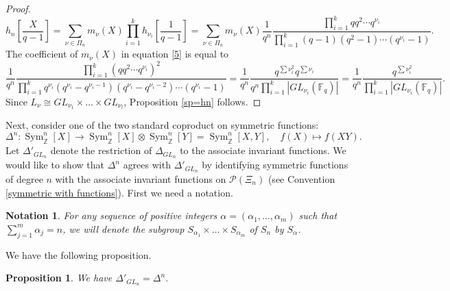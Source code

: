\documentclass{amsart}
\theoremstyle{plain}
\newtheorem{proposition}{Proposition}[section]
\newtheorem{notation}{Notation}[section]
\theoremstyle{definition}
\theoremstyle{remark}
\DeclareMathOperator{\Sym}{Sym}
\begin{document}
\begin{proof}
\begin{equation}
h_{n}\left[\frac{X}{q-1}\right]
=
\sum_{\nu\in\Pi_{n}}m_{\nu}(X)\prod_{i=1}^{k}h_{\nu_i}\left[\frac{1}{q-1}\right]
=
\sum_{\nu\in\Pi_{n}}m_{\nu}(X)\frac{1}{q^n}\frac{\prod_{i=1}^{k}q q^2\cdots q^{\nu_i}}{\prod_{i=1}^{k}(q-1)(q^2-1)\cdots(q^{\nu_i}-1)}.
\end{equation}
The coefficient of $m_{\nu}(X)$ in equation \eqref{5} is equal to
\[
\frac{1}{q^n}\frac{\prod_{i=1}^{k}(q q^2\cdots q^{\nu_i})^{2}}{\prod_{i=1}^{k}q^{\nu_{i}}(q^{\nu_{i}}-q^{\nu_{i}-1})(q^{\nu_i}-q^{\nu_{i}-2})\cdots(q^{\nu_i}-1)}=\frac{1}{q^n}\frac{q^{\sum \nu_{i}^{2}}q^{\sum \nu_i}}{q^{n}\prod_{i=1}^{k}|GL_{\nu_{i}}(\mathbb{F}_{q})|}=\frac{1}{q^n}\frac{q^{\sum \nu_{i}^{2}}}{\prod_{i=1}^{k}|GL_{\nu_{i}}(\mathbb{F}_{q})|}.
\]
Since $L_{\nu}\cong GL_{\nu_{1}}\times\ldots\times GL_{\nu_{l}}$, Proposition \ref{sp=hn} follows.
\end{proof}
Next, consider one of the two standard coproduct on symmetric functions:
\[
    \Delta^{n}:\Sym^{n}_{\mathbb{Z}}[X] \rightarrow\Sym^{n}_{\mathbb{Z}}[X]\otimes\Sym^{n}_{\mathbb{Z}}[Y]=\Sym^{n}_{\mathbb{Z}}[X,Y], \quad f(X)\mapsto f(XY).
\]
Let $\Delta'_{GL_{n}}$ denote the restriction of $\Delta_{GL_{n}}$ to the associate invariant functions. We would like to show that $\Delta^n$ agrees with $\Delta'_{GL_{n}}$ by identifying symmetric functions of degree $n$ with the associate invariant functions on $\mathcal{P}(\Xi_{n})$ (see Convention \ref{symmetric with functions}).
First we need a notation.
\begin{notation}
For any sequence of positive integers $\alpha=(\alpha_{1},\ldots,\alpha_{m})$ such that $\sum_{j=1}^{m}\alpha_{j}=n$, we will denote the subgroup $S_{\alpha_{1}}\times\ldots\times S_{\alpha_{m}}$ of $S_{n}$ by $S_\alpha$.
\end{notation}
We have the following proposition.
\begin{proposition}\label{coproduct agrees with coproduct}
We have
$
\Delta'_{GL_{n}}=\Delta^n.
$
\end{proposition}
\end{document}
